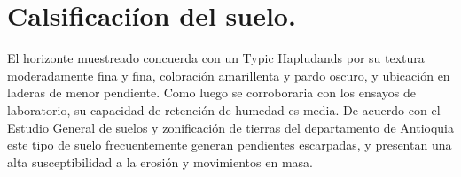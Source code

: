 \section{Calsificaci\'ion del suelo.}
El horizonte muestreado concuerda con un Typic Hapludands \cite{instituto2000estudio} por su textura moderadamente fina y fina, coloraci\'on  amarillenta y pardo oscuro, y ubicaci\'on en laderas de menor pendiente. Como luego se corroboraria con los ensayos de laboratorio, su capacidad de retenci\'on de humedad es media.
De acuerdo con el Estudio General de suelos y zonificación de tierras del departamento de Antioquia \cite{instituto2000estudio} este tipo de suelo frecuentemente generan pendientes escarpadas, y presentan una alta susceptibilidad a la erosi\'on y movimientos en masa.